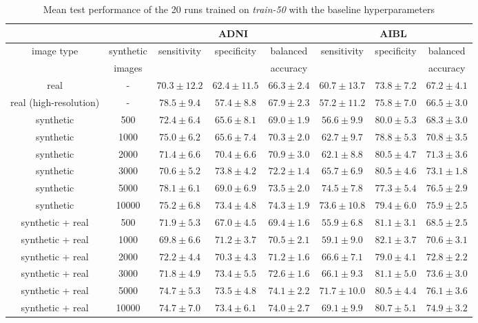 \documentclass[10pt,journal,compsoc]{IEEEtran}
\begin{document}
\begin{table*}[ht]
 \caption{Mean test performance of the 20 runs trained on \textit{train-50} with the baseline hyperparameters}
 \label{table: app train-50_Conv5F3}
\centering
\scriptsize
  \begin{tabular}{|c|c||c|c|c||c|c|c|}
    \cline{3-8}
    \multicolumn{2}{c|}{} & \multicolumn{3}{c||}{ADNI} & \multicolumn{3}{c|}{AIBL} \\
    \hline
    \multirow{2}{*}{image type} & synthetic & \multirow{2}{*}{sensitivity} & \multirow{2}{*}{specificity} & balanced & \multirow{2}{*}{sensitivity} & \multirow{2}{*}{specificity} & balanced \\
    & images & & & accuracy & & & accuracy \\
    \hline
    \hline
    real & - & $70.3\pm12.2$ & $62.4\pm11.5$ & $66.3\pm2.4$ & $60.7\pm13.7$ & $73.8\pm7.2$ & $67.2\pm4.1$ \\
    real (high-resolution) & - & $78.5\pm9.4$ & $57.4\pm8.8$ & $67.9\pm2.3$ & $57.2\pm11.2$ & $75.8\pm7.0$ & $66.5\pm3.0$ \\
    \hline
    synthetic & 500 & $72.4\pm6.4$ & $65.6\pm8.1$ & $69.0\pm1.9$ & $56.6\pm9.9$ & $80.0\pm5.3$ & $68.3\pm3.0$ \\
    synthetic & 1000 & $75.0\pm6.2$ & $65.6\pm7.4$ & $70.3\pm2.0$ & $62.7\pm9.7$ & $78.8\pm5.3$ & $70.8\pm3.5$ \\
    synthetic & 2000 & $71.4\pm6.6$ & $70.4\pm6.6$ & $70.9\pm3.0$ & $62.1\pm8.8$ & $80.5\pm4.7$ & $71.3\pm3.6$ \\
    synthetic & 3000 & $70.6\pm5.2$ & $\boldsymbol{73.8\pm4.2}$ & $72.2\pm1.4$ & $65.7\pm6.9$ & $80.5\pm4.6$ & $73.1\pm1.8$ \\
    synthetic & 5000 & $\boldsymbol{78.1\pm6.1}$ & $69.0\pm6.9$ & $73.5\pm2.0$ & $\boldsymbol{74.5\pm7.8}$ & $77.3\pm5.4$ & $\boldsymbol{76.5\pm2.9}$ \\
    synthetic & 10000 & $75.2\pm6.8$ & $73.4\pm4.8$ & $\boldsymbol{74.3\pm1.9}$ & $73.6\pm10.8$ & $\boldsymbol{79.4\pm6.0}$ & $75.9\pm2.5$ \\
    \hline
    synthetic + real & 500 & $71.9\pm5.3$ & $67.0\pm4.5$ & $69.4\pm1.6$ & $55.9\pm6.8$ & $81.1\pm3.1$ & $68.5\pm2.5$ \\
    synthetic + real & 1000 & $69.8\pm6.6$ & $71.2\pm3.7$ & $70.5\pm2.1$ & $59.1\pm9.0$ & $82.1\pm3.7$ & $70.6\pm3.1$ \\
    synthetic + real & 2000 & $72.2\pm4.4$ & $70.3\pm4.3$ & $71.2\pm1.6$ & $66.6\pm7.1$ & $79.0\pm4.1$ & $72.8\pm2.2$ \\
    synthetic + real & 3000 & $71.8\pm4.9$ & $73.4\pm5.5$ & $72.6\pm1.6$ & $66.1\pm9.3$ & $81.1\pm5.0$ & $73.6\pm3.0$ \\
    synthetic + real & 5000 & $\boldsymbol{74.7\pm5.3}$ & $\boldsymbol{73.5\pm4.8}$ & $\boldsymbol{74.1\pm2.2}$ & $\boldsymbol{71.7\pm10.0}$ & $80.5\pm4.4$ & $\boldsymbol{76.1\pm3.6}$ \\
    synthetic + real & 10000 & $74.7\pm7.0$ & $73.4\pm6.1$ & $74.0\pm2.7$ & $69.1\pm9.9$ & $\boldsymbol{80.7\pm5.1}$ & $74.9\pm3.2$ \\
    \hline
  \end{tabular}%
\end{table*}
\end{document}
